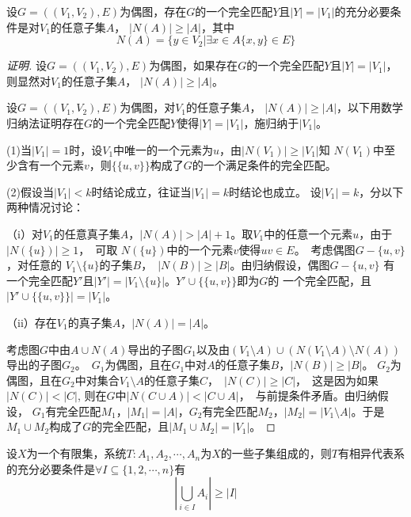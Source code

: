     \begin{Thm}
    设$G=((V_1,V_2),E)$为偶图，存在$G$的一个完全匹配$Y$且$|Y| = |V_1|$的充分必要条件是对$V_1$的任意子集$A$， $|N(A)| \geq |A|$，其中\[N(A) = \{y\in V_2|\exists x \in A \{x,y\} \in E\}\]
  \end{Thm}
  \begin{proof}[证明]
设$G=((V_1,V_2),E)$为偶图，如果存在$G$的一个完全匹配$Y$且$|Y| = |V_1|$，则显然对$V_1$的任意子集$A$， $|N(A)| \geq |A|$。

设$G=((V_1,V_2),E)$为偶图，对$V_1$的任意子集$A$， $|N(A)| \geq |A|$，以下用数学归纳法证明存在$G$的一个完全匹配$Y$使得$|Y| = |V_1|$，施归纳于$|V_1|$。

(1)当$|V_1|=1$时，设$V_1$中唯一的一个元素为$u$，由$|N(V_1)| \geq |V_1|$知
$N(V_1)$中至少含有一个元素$v$，则$\{\{u,v\}\}$构成了$G$的一个满足条件的完全匹配。

(2)假设当$|V_1|<k$时结论成立，往证当$|V_1|=k$时结论也成立。
设$|V_1|=k$，分以下两种情况讨论：

（i）对$V_1$的任意真子集$A$，$|N(A)| > |A| + 1$。取$V_1$中的任意一个元素$u$，由于$|N(\{u\})| \geq 1$，　可取
$N(\{u\})$中的一个元素$v$使得$uv \in E$。　考虑偶图$G-\{u,v\}$，对任意的
$V_1\setminus \{u\}$的子集$B$，　$|N(B)| \geq |B|$。由归纳假设，偶图$G-\{u,v\}$
有一个完全匹配$Y'$且$|Y'| = |V_1\setminus \{u\}|$。$Y' \cup \{\{u,v\}\}$即为$G$的
一个完全匹配，且$|Y' \cup \{\{u,v\}\}| = |V_1|$。

（ii）存在$V_1$的真子集$A$，$|N(A)| = |A|$。

考虑图$G$中由$A \cup N(A)$导出的子图$G_1$以及由$(V_1\setminus A) \cup
(N(V_1\setminus A)\setminus N(A))$导出的子图$G_2$。　$G_1$为偶图，且在$G_1$中对$A$的任意子集$B$，$|N(B)| \geq |B|$。
$G_2$为偶图，且在$G_2$中对集合$V_1\setminus A$的任意子集$C$，　$|N(C)| \geq |C|$，　这是因为如果
$|N(C)| < |C|$, 则在$G$中$|N(C \cup A)| < |C \cup A|$，　与前提条件矛盾。由归纳假设，
$G_1$有完全匹配$M_1$，$|M_1|=|A|$，$G_2$有完全匹配$M_2$，$|M_2|=|V_1\setminus A|$。于是
$M_1\cup M_2$构成了$G$的完全匹配，且$|M_1\cup M_2| = |V_1|$。
  \end{proof}


  \begin{Thm}
    设$X$为一个有限集，系统$T:A_1,A_2,\cdots,A_n$为$X$的一些子集组成的，则$T$有相异代表系的充分必要条件是$\forall I \subseteq \{1,2,\cdots, n\}$有
    \[|\bigcup_{i\in I}A_i|\geq |I|\]
  \end{Thm}



\chapter{}
